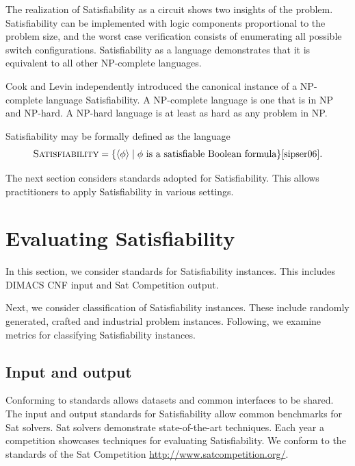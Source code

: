 \FloatBarrier

The realization of {\sc Satisfiability} as a circuit shows two insights of the problem.  {\sc Satisfiability} can be implemented with logic components proportional to the problem size, and the worst case verification consists of enumerating all possible switch configurations.  {\sc Satisfiability} as a language demonstrates that it is equivalent to all other \textsf{NP-complete} languages.

Cook and Levin independently introduced the canonical instance of a \textsf{NP-complete} language {\sc Satisfiability}\cite{Cook:1971:CTP:800157.805047, levin1973}.  A \textsf{NP-complete} language is one that is in \textsf{NP} and \textsf{NP-hard}.  A \textsf{NP-hard} language is at least as hard as any problem in \textsf{NP}.

{\sc Satisfiability} may be formally defined as the language
\[
\text{\sc Satisfiability} = \{ \langle \phi \rangle \mid \phi \text{ is a satisfiable Boolean formula}\} \cite{sipser06}.
\]	
	

The next section considers standards adopted for {\sc Satisfiability}.  This allows practitioners to apply {\sc Satisfiability} in various settings.
	
\section{Evaluating {\sc Satisfiability}}

	
	In this section, we consider standards for {\sc Satisfiability} instances.  This includes DIMACS CNF input and {\sc Sat} Competition output.  
	
	Next, we consider classification of {\sc Satisfiability} instances.  These include randomly generated, crafted and industrial problem instances.  Following, we examine metrics for classifying {\sc Satisfiability} instances.

	\subsection{Input and output}
	
	
  Conforming to standards allows datasets and common interfaces to be shared.  The input and output standards for {\sc Satisfiability} allow common benchmarks for {\sc Sat} solvers.  {\sc Sat} solvers demonstrate state-of-the-art techniques. Each year a competition showcases techniques for evaluating {\sc Satisfiability}.  We conform to the standards of the {\sc Sat} Competition \url{http://www.satcompetition.org/}.
	

